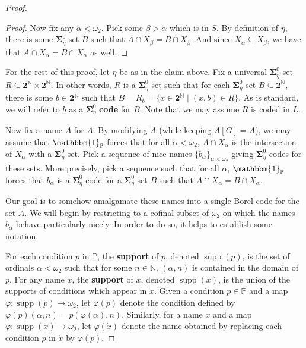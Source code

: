 \documentclass[11pt]{amsart}
\newcommand\defword[1]{\textbf{#1}}
\newcommand{\N}{\mathbb{N}}
\renewcommand\phi{\varphi}
\newcommand\two{\mathbf{2}}
\newcommand\bbP{\mathbb{P}}
\newcommand\bbone{\mathbbm{1}}
\newcommand\supp{\operatorname{supp}}
\newcommand\Cantor{\two^\N}
\theoremstyle{definition}
\theoremstyle{remark}
\theoremstyle{plain}
\begin{document}
\begin{proof}
\begin{proof}
Now fix any $\alpha < \omega_2$. Pick some $\beta > \alpha$ which is in $S$. By definition of $\eta$, there is some $\mathbf{\Sigma}^0_\eta$ set $B$ such that $A \cap X_\beta = B\cap X_\beta$. And since $X_\alpha \subseteq X_\beta$, we have that $A\cap X_\alpha = B\cap X_\alpha$ as well.
\end{proof}

For the rest of this proof, let $\eta$ be as in the claim above. Fix a universal $\mathbf{\Sigma}^0_\eta$ set $R \subseteq \Cantor\times\Cantor$. In other words, $R$ is a $\mathbf{\Sigma}^0_\eta$ set such that for each $\mathbf{\Sigma}^0_\eta$ set $B \subseteq \Cantor$, there is some $b \in \Cantor$ such that $B = R_b = \{x \in \Cantor \mid (x, b) \in R\}$. As is standard, we will refer to $b$ as a $\mathbf{\Sigma}^0_\eta$ \defword{code} for $B$. Note that we may assume $R$ is coded in $L$.

Now fix a name $\dot{A}$ for $A$. By modifying $\dot{A}$ (while keeping $\dot{A}[G] = A$), we may assume that $\bbone_\bbP$ forces that for all $\alpha < \omega_2$, $\dot{A}\cap X_\alpha$ is the intersection of $X_\alpha$ with a $\mathbf{\Sigma}^0_\eta$ set. Pick a sequence of nice names $\{\dot{b}_\alpha\}_{\alpha < \omega_2}$ giving $\mathbf{\Sigma}^0_\eta$ codes for these sets. More precisely, pick a sequence such that for all $\alpha$, $\bbone_\bbP$ forces that $\dot{b}_\alpha$ is a $\mathbf{\Sigma}^0_\eta$ code for a $\mathbf{\Sigma}^0_\eta$ set $B$ such that $\dot{A} \cap X_\alpha = B \cap X_\alpha$.

Our goal is to somehow amalgamate these names into a single Borel code for the set $A$. We will begin by restricting to a cofinal subset of $\omega_2$ on which the names $\dot{b}_\alpha$ behave particularly nicely. In order to do so, it helps to establish some notation.

For each condition $p$ in $\bbP$, the \defword{support} of $p$, denoted $\supp(p)$, is the set of ordinals $\alpha < \omega_2$ such that for some $n \in \N$, $(\alpha, n)$ is contained in the domain of $p$. For any name $\dot{x}$, the \defword{support} of $x$, denoted $\supp(\dot{x})$,  is the union of the supports of conditions which appear in $\dot{x}$. Given a condition $p \in \bbP$ and a map $\phi \colon \supp(p) \to \omega_2$, let $\phi(p)$ denote the condition defined by $\phi(p)(\alpha, n) = p(\phi(\alpha), n)$. Similarly, for a name $\dot{x}$ and a map $\phi \colon \supp(\dot{x}) \to \omega_2$, let $\phi(\dot{x})$ denote the name obtained by replacing each condition $p$ in $\dot{x}$ by $\phi(p)$.


\end{proof}
\end{document}
